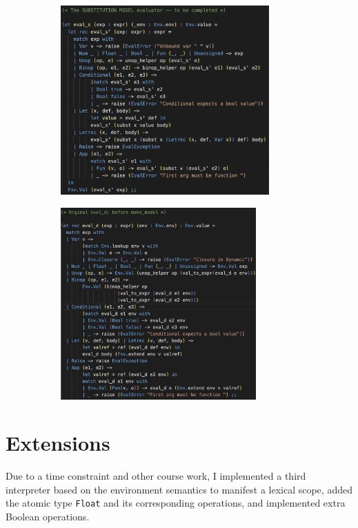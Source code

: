 \documentclass[12pt]{article}
\def\code#1{\texttt{#1}}
\begin{document}
\begin{figure}[h]
  \centering

  \begin{subfigure}{0.45\textwidth}
    \includegraphics[width=8cm]{Eval_S.png}
  \end{subfigure}
  \hfill
  \begin{subfigure}{0.45\textwidth}
    \includegraphics[width=7.5cm]{Eval_D.png}
  \end{subfigure}
\end{figure}

\section{Extensions}
Due to a time constraint and other course work, I implemented a third interpreter based on the environment semantics to manifest a lexical scope, added the atomic type \code{Float} and its corresponding operations, and implemented extra Boolean operations.
\end{document}
